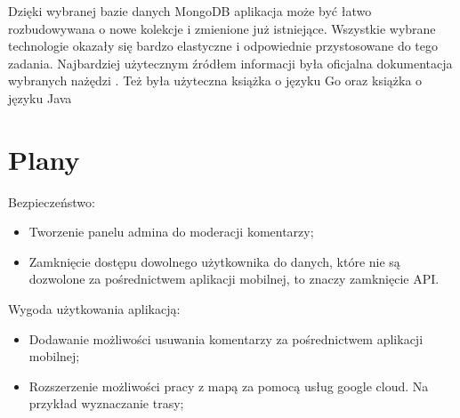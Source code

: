 Dzięki wybranej bazie danych MongoDB aplikacja może być łatwo rozbudowywana o nowe kolekcje i zmienione już istniejące. Wszystkie wybrane technologie okazały się bardzo elastyczne i odpowiednie przystosowane do tego zadania.
Najbardziej użytecznym źródłem informacji była oficjalna dokumentacja wybranych nażędzi \cite{android_doc,godoc,golang2,mongoDB_doc}. Też była użyteczna książka o języku Go \cite{LearninGo} oraz książka o języku Java \cite{javabook}
%
\section{Plany}
\label{sec:plany}

Bezpieczeństwo:
\begin{itemize}
    \item Tworzenie panelu admina do moderacji komentarzy;
    \item Zamknięcie dostępu dowolnego użytkownika do danych, które nie są dozwolone za pośrednictwem aplikacji mobilnej, to znaczy zamknięcie API.
\end{itemize}

Wygoda użytkowania aplikacją:
\begin{itemize}
    \item Dodawanie możliwości usuwania komentarzy za pośrednictwem aplikacji mobilnej;
    \item Rozszerzenie możliwości pracy z mapą za pomocą usług google cloud. Na przykład wyznaczanie trasy;
\end{itemize}